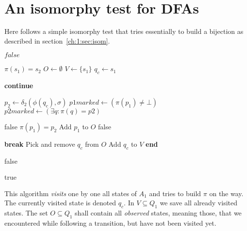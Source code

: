 
\chapter{An isomorphy test for DFAs}\label{ch:app:ism-test}

Here follows a simple isomorphy test that tries essentially to build a bijection as described in section~\ref{ch:1:sec:isom}.
\vspace{0.2cm}
\begin{algorithmic}[1]
			\State \Return $false$
		\EndIf
		
		\State $\pi(s_1) = s_2$ 
		\State $O \gets \emptyset$ 
		\State $V \gets \{s_1\}$ 
		\State $q_c \gets s_1$ 
		
			 
					\State \textbf{continue}
				\EndIf
				
				\State
				
				\State $p_2 \gets \delta_2(\phi(q_c), \sigma)$ 
				\State $p1marked \gets (\pi(p_1) \neq \bot)$ 
				\State $p2marked \gets (\exists q\colon \pi(q)=p2)$
				
				\State
				
						\State \Return false
					\EndIf
					\State $\pi(p_1) = p_2$
					\State Add $p_1$ to $O$
				\EndIf
				\Else {}
					\State \Return false
				\EndIf
			\EndFor	
			
				\State \textbf{break}
			\EndIf
			\State Pick and remove $q_c$ from $O$
			\State Add $q_c$ to $V$
		\EndWhile
		\State\textbf{end}
		
				\State \Return false
			\EndIf
		\EndFor	
		
		\State \Return true
	\EndFunction
\end{algorithmic}
\vspace{0.2cm}
This algorithm \emph{visits} one by one all states of $A_1$ and tries to build $\pi$ on the way. The currently visited state is denoted $q_c$. In $V \subseteq Q_1$ we save all already visited states. The set $O \subseteq Q_1$ shall contain all \emph{observed} states, meaning those, that we encountered while following a transition, but have not been visited yet.

